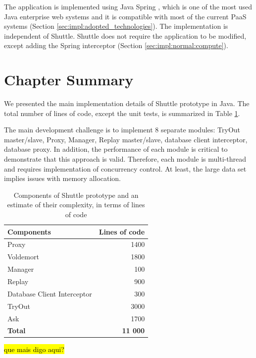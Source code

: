 The application is implemented using Java Spring \cite{spring}, which is one of the most used Java enterprise web systems and it is compatible with most of the current \ac{PaaS} systems (Section \ref{sec:impl:adopted_technologies}). The implementation is independent of Shuttle. Shuttle does not require the application to be modified, except adding the Spring interceptor (Section \ref{sec:impl:normal:compute}). 


\section{Chapter Summary}\label{sec:impl:summary}
We presented the main implementation details of Shuttle prototype in Java. The total number of lines of code, except the unit tests, is summarized in Table \ref{tab:lines_of_code}.

The main development challenge is to implement 8 separate modules: TryOut master/slave, Proxy, Manager, Replay master/slave, database client interceptor, database proxy. In addition, the performance of each module is critical to demonstrate that this approach is valid. Therefore, each module is multi-thread and requires implementation of concurrency control. At least, the large data set implies issues with memory allocation.

\begin{table}[ht]
\begin{tabular}{lr}
\textbf{Components} 		& \textbf{Lines of code} \\ \hline
Proxy                      	& 1400    			\\   
Voldemort                  	& 1800    			\\
Manager                    	& 100     			\\    
Replay 			           	& 900     			\\    
Database Client Interceptor & 300     			\\     
TryOut                      & 3000    			\\    
Ask                         & 1700    			\\  \hline  
\textbf{Total}              & \textbf{11 000}  \\        
\end{tabular}
	\caption[Components of Shuttle prototype and an estimate of their complexity]
			{Components of Shuttle prototype and an estimate of their complexity, in terms of lines of code}
	\label{tab:lines_of_code}
\end{table}

\hl{que mais digo aqui?}

